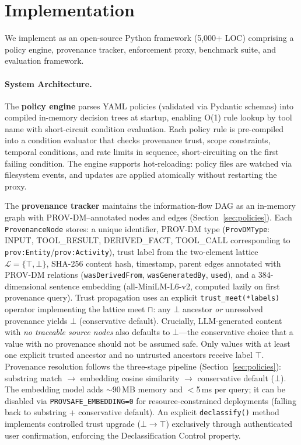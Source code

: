 \section{Implementation}
\label{sec:impl}

We implement \sys{} as an open-source Python framework (5,000+ LOC) comprising a policy engine, provenance tracker, enforcement proxy, benchmark suite, and evaluation framework.

\paragraph{System Architecture.}
The \textbf{policy engine} parses YAML policies (validated via Pydantic schemas) into compiled in-memory decision trees at startup, enabling O(1) rule lookup by tool name with short-circuit condition evaluation. Each policy rule is pre-compiled into a condition evaluator that checks provenance trust, scope constraints, temporal conditions, and rate limits in sequence, short-circuiting on the first failing condition. The engine supports hot-reloading: policy files are watched via filesystem events, and updates are applied atomically without restarting the proxy.

The \textbf{provenance tracker} maintains the information-flow DAG as an in-memory graph with PROV-DM--annotated nodes and edges (Section~\ref{sec:policies}). Each \texttt{ProvenanceNode} stores: a unique identifier, PROV-DM type (\texttt{ProvDMType}: INPUT, TOOL\_RESULT, DERIVED\_FACT, TOOL\_CALL corresponding to \texttt{prov:Entity}/\texttt{prov:Activity}), trust label from the two-element lattice $\mathcal{L} = \{\top, \bot\}$, SHA-256 content hash, timestamp, parent edges annotated with PROV-DM relations (\texttt{wasDerivedFrom}, \texttt{wasGeneratedBy}, \texttt{used}), and a 384-dimensional sentence embedding (all-MiniLM-L6-v2, computed lazily on first provenance query). Trust propagation uses an explicit \texttt{trust\_meet(*labels)} operator implementing the lattice meet $\sqcap$: any $\bot$ ancestor \emph{or} unresolved provenance yields $\bot$ (conservative default). Crucially, LLM-generated content with \emph{no traceable source nodes} also defaults to $\bot$---the conservative choice that a value with no provenance should not be assumed safe. Only values with at least one explicit trusted ancestor and no untrusted ancestors receive label $\top$. Provenance resolution follows the three-stage pipeline (Section~\ref{sec:policies}): substring match $\to$ embedding cosine similarity $\to$ conservative default ($\bot$). The embedding model adds $\sim$90\,MB memory and $<$5\,ms per query; it can be disabled via \texttt{PROVSAFE\_EMBEDDING=0} for resource-constrained deployments (falling back to substring + conservative default). An explicit \texttt{declassify()} method implements controlled trust upgrade ($\bot \to \top$) exclusively through authenticated user confirmation, enforcing the Declassification Control property.

